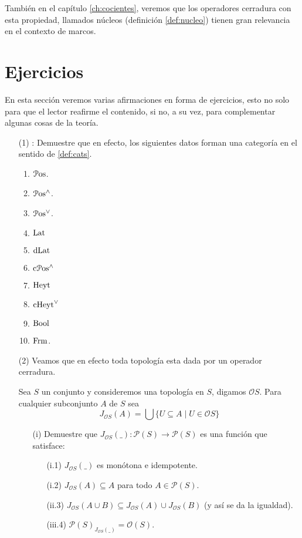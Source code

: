 También en el capítulo \ref{ch:cocientes}, veremos que
los operadores cerradura con esta propiedad, llamados núcleos
(definición \ref{def:nucleo}) tienen gran
relevancia en el contexto de marcos.


\section{Ejercicios}\label{exes}

En esta sección veremos varias afirmaciones en forma de ejercicios, esto no solo para que el lector reafirme el contenido, si no, a su vez, para complementar algunas cosas de la teoría.
\begin{itemize}
  \item[(1)]:
  Demuestre que en efecto, los siguientes datos forman una categoría en el sentido de \ref{def:cats}.
  \begin{enumerate}
    \item $\mathcal{P}\mathrm{os}$.
    \item $\mathcal{P}\mathrm{os}^{\wedge}$.
    \item $\mathcal{P}\mathrm{os}^{\vee}$.
    \item $\mathrm{Lat}$
    \item $\mathrm{dLat}$
    \item $\mathrm{c}\mathcal{P}\mathrm{os}^\wedge$
    \item $\mathrm{Heyt}$
    \item $\mathrm{cHeyt}^\vee$
    \item $\mathrm{Bool}$
    \item $\mathrm{Frm}$.
  
  \end{enumerate}
\item[(2)]
Veamos que en efecto toda topología esta dada por un operador cerradura.

   Sea $S$ un conjunto y consideremos una topología en $S$, digamos $\mathcal{O}S$.
  Para cualquier subconjunto $A$ de $S$ sea \[J_{\mathcal{O}S}(A)=\bigcup\{U\subseteq A\mid U\in\mathcal{O}S\}\]
  
\begin{enumerate}
  \item[(i)] Demuestre que $J_{\mathcal{O}S}(\_)\colon\mathcal{P}(S)\rightarrow\mathcal{P}(S)$ es una función que satisface:
  \begin{itemize}
    \item[(i.1)] $J_{\mathcal{O}S}(\_)$ es monótona e idempotente.
    \item[(i.2)] $J_{\mathcal{O}S}(A)\subseteq A$ para todo $A\in\mathcal{P}(S)$.
    \item[(ii.3)] $J_{\mathcal{O}S}(A\cup B)\subseteq J_{\mathcal{O}S}(A)\cup J_{\mathcal{O}S}(B)$ (y así se da la igualdad). 
    \item[(iii.4)] $\mathcal{P}(S)_{J_{\mathcal{O}S}(\_)}=\mathcal{O}(S)$. 
  \end{itemize} 
\end{enumerate}
\end{itemize}




